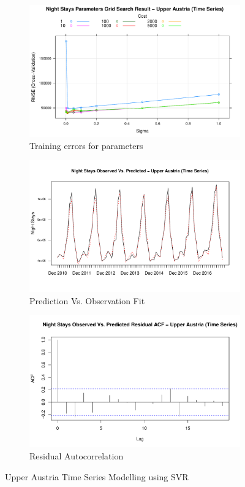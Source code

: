 \documentclass[a4paper,reqno,]{article}
\begin{document}
\begin{figure}[H]
  \centering
  \begin{subfigure}[b]{0.32\linewidth}
    \includegraphics[width=\linewidth]{images/SVR/UpperAustriaGrid.pdf}
    \caption{Training errors for parameters}
  \end{subfigure}
  \begin{subfigure}[b]{0.32\linewidth}
    \includegraphics[width=\linewidth]{images/SVR/UpperAustriaTimeSeries.pdf}
    \caption{Prediction Vs. Observation Fit}
  \end{subfigure}
  \begin{subfigure}[b]{0.32\linewidth}
    \includegraphics[width=\linewidth]{images/SVR/UpperAustriaACF.pdf}
    \caption{Residual Autocorrelation}
  \end{subfigure}
  \caption{Upper Austria Time Series Modelling using SVR}
  \label{fig:Time Series}
\end{figure}
\end{document}
